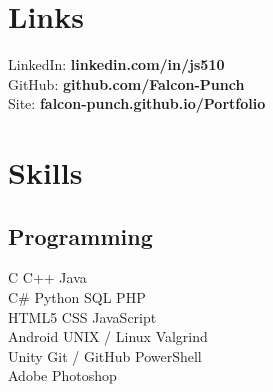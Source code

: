 \documentclass[letterpaper]{deedy-resume} %
\newcommand{\CS}{C\#}
\begin{document}



\begin{minipage}[t]{0.33\textwidth} %


\section{Links} 

LinkedIn: {\bf linkedin.com/in/js510}\\
GitHub: {\bf github.com/Falcon-Punch}\\
Site: {\bf falcon-punch.github.io/Portfolio}

\sectionspace %


\section{Skills}

\subsection{Programming}
\vspace{1.5mm}
C \textbullet{} C++ \textbullet{} Java \\
\vspace{1.5mm}
\CS{} \textbullet{} Python \textbullet{} SQL \textbullet{} PHP \\
HTML5 \textbullet{} CSS \textbullet{} JavaScript \\
\vspace{1.5mm}
Android \textbullet{} UNIX / Linux \textbullet{} Valgrind \\
Unity \textbullet{} Git / GitHub \textbullet{} PowerShell \\
Adobe Photoshop


\end{minipage}
\end{document}
